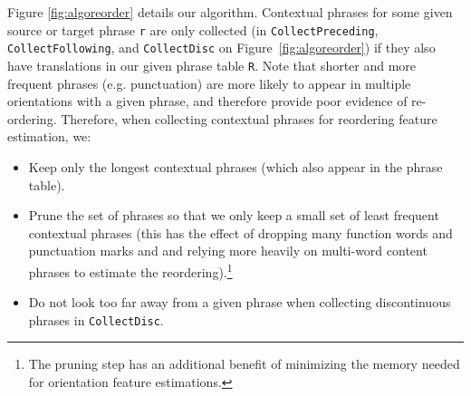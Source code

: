 \documentclass[11pt,letterpaper]{article}
\newcommand{\figref}[1]{Figure~\ref{#1}}
\newcommand{\code}[1]{{\small \tt #1}}
\newcommand{\emq}[1]{\emph{``#1''}}
\begin{document}

Figure \ref{fig:algoreorder} details our algorithm. Contextual phrases for some given source or target phrase \code{r} are only collected (in \code{CollectPreceding}, \code{CollectFollowing}, and \code{CollectDisc} on \figref{fig:algoreorder}) if they also have translations in our given phrase table \code{R}.  Note that shorter and more frequent phrases (e.g. punctuation) are more likely to appear in multiple orientations with a given phrase, and therefore provide poor evidence of re-ordering.  Therefore, when collecting contextual phrases for reordering feature estimation, we:

\begin{itemize}
  \item Keep only the longest contextual phrases (which also appear in the phrase table).
  \item Prune the set of phrases so that we only keep a small set of least frequent contextual phrases (this has the effect of dropping many function words and punctuation marks and and relying more heavily on multi-word content phrases to estimate the reordering).\footnote{The pruning step has an additional benefit of minimizing the memory needed for orientation feature estimations.}
  \item Do not look too far away from a given phrase when collecting discontinuous phrases in \code{CollectDisc}.
\end{itemize}
\end{document}
